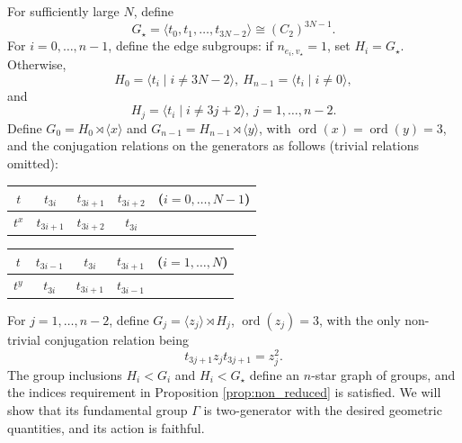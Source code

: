 \documentclass[12pt,leqno]{amsart}
\newcommand{\2}{L^2_{\rm per}(0, T)}
\newcommand{\ord}{{\operatorname{ord}}}
\numberwithin{equation}{section}
\numberwithin{figure}{section}
\begin{document}
For sufficiently large $N$, define
\[
G_\star = \langle t_0,t_1,\dots, t_{3N-2}\rangle\cong (C_2)^{3N-1}.
\]
For $i=0,\dots, n-1$, define the edge subgroups: if $n_{e_i,v_\star} = 1$, set $H_i = G_\star$. Otherwise,
\[
H_0 = \langle t_i\mid i\neq 3N-2\rangle,\ H_{n-1} = \langle t_i\mid i\neq 0\rangle,
\]
and
\[
H_j = \langle t_i\mid i\neq 3j+2\rangle,\ j=1,\dots, n-2.
\]
Define $G_0 = H_0\rtimes \langle x\rangle$ and $G_{n-1} = H_{n-1}\rtimes \langle y\rangle$, with $\ord(x) = \ord(y) = 3$, and the conjugation relations on the generators as follows (trivial relations omitted):
\begin{center}
    \begin{tabular}{c||c|c|cc}
        $t$ & $t_{3i}$ & $t_{3i+1}$ & $t_{3i+2}$ & ($i=0,\dots,N-1$) \\
        \hline
        $t^x$ & $t_{3i+1}$ & $t_{3i+2}$ & $t_{3i}$ &
    \end{tabular}
\end{center}
\begin{center}
    \begin{tabular}{c||c|c|cc}
        $t$ & $t_{3i-1}$ & $t_{3i}$ & $t_{3i+1}$ & ($i=1,\dots,N$) \\
        \hline
        $t^y$ & $t_{3i}$ & $t_{3i+1}$ & $t_{3i-1}$
    \end{tabular}
\end{center}
For $j=1,\dots, n-2$, define $G_j = \langle z_j\rangle\rtimes H_j$, $\ord(z_j) = 3$, with the only non-trivial conjugation relation being
\[
t_{3j+1}z_jt_{3j+1} = z_j^2.
\]
The group inclusions $H_i<G_i$ and $H_i<G_\star$ define an $n$-star graph of groups, and the indices requirement in Proposition \ref{prop:non_reduced} is satisfied. We will show that its fundamental group $\Gamma$ is two-generator with the desired geometric quantities, and its action is faithful.
\end{document}
